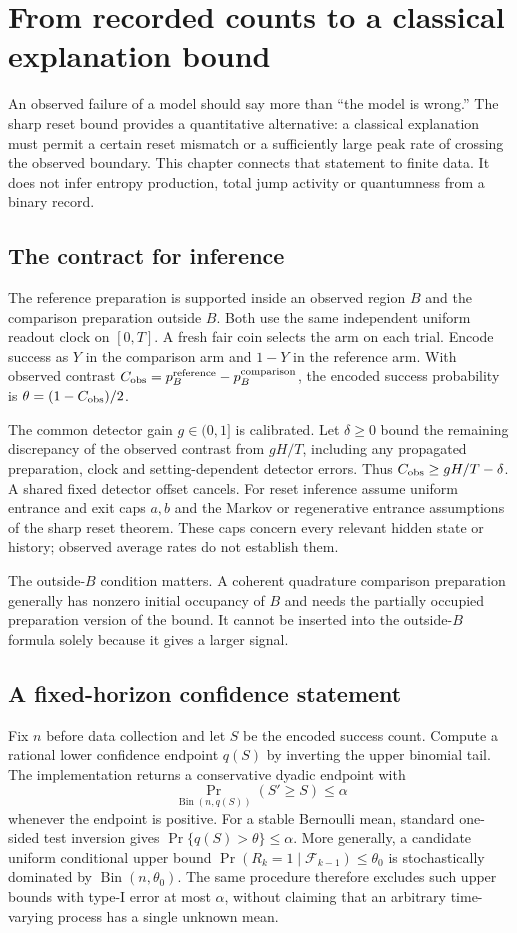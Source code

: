 \chapter{From recorded counts to a classical explanation bound}
\label{rr:explanation}

An observed failure of a model should say more than ``the model is wrong.''
The sharp reset bound provides a quantitative alternative: a classical
explanation must permit a certain reset mismatch or a sufficiently large
peak rate of crossing the observed boundary. This chapter connects that
statement to finite data. It does not infer entropy production, total jump
activity or quantumness from a binary record.

\section{The contract for inference}
The reference preparation is supported inside an observed region $B$ and
the comparison preparation outside $B$. Both use the same independent
uniform readout clock on $[0,T]$. A fresh fair coin selects the arm on each
trial. Encode success as $Y$ in the comparison arm and $1-Y$ in the reference
arm. With observed contrast
$C_{\rm obs}=p_B^{\rm reference}-p_B^{\rm comparison}$, the encoded success
probability is $\theta=(1-C_{\rm obs})/2$.

The common detector gain $g\in(0,1]$ is calibrated. Let $\delta\geq0$ bound
the remaining discrepancy of the observed contrast from $gH/T$, including
any propagated preparation, clock and setting-dependent detector errors.
Thus $C_{\rm obs}\geq gH/T-\delta$. A shared fixed detector offset cancels.
For reset inference assume uniform entrance and exit caps $a,b$ and the
Markov or regenerative entrance assumptions of the sharp reset theorem.
These caps concern every relevant hidden state or history; observed average
rates do not establish them.

The outside-$B$ condition matters. A coherent quadrature comparison
preparation generally has nonzero initial occupancy of $B$ and needs the
partially occupied preparation version of the bound. It cannot be inserted
into the outside-$B$ formula solely because it gives a larger signal.

\section{A fixed-horizon confidence statement}
Fix $n$ before data collection and let $S$ be the encoded success count.
Compute a rational lower confidence endpoint $q(S)$ by inverting the upper
binomial tail. The implementation returns a conservative dyadic endpoint
with
\[
 \Pr_{\operatorname{Bin}(n,q(S))}(S'\geq S)\leq\alpha
\]
whenever the endpoint is positive. For a stable Bernoulli mean, standard
one-sided test inversion gives $\Pr\{q(S)>\theta\}\leq\alpha$.
More generally, a candidate uniform conditional upper bound
$\Pr(R_k=1\mid\mathcal F_{k-1})\leq\theta_0$ is stochastically dominated
by $\operatorname{Bin}(n,\theta_0)$. The same procedure therefore excludes
such upper bounds with type-I error at most $\alpha$, without claiming that
an arbitrary time-varying process has a single unknown mean.

